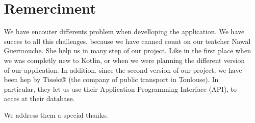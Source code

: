 \section{Remerciment}

We have encouter differents problem when develloping the application. We have succes to all this challenges, because we have canned count on our teatcher Nawal Guermouche. She help us in many step of our project. Like in the first place when we was completly new to Kotlin, or when we were planning the different version of our application. 
In addition, since the second version of our project, we have been hep by Tisséo® (the company of public transport in Toulouse). In particular, they let us use their Application Programming Interface (API), to acces at their database.


We address them a special thanks.
